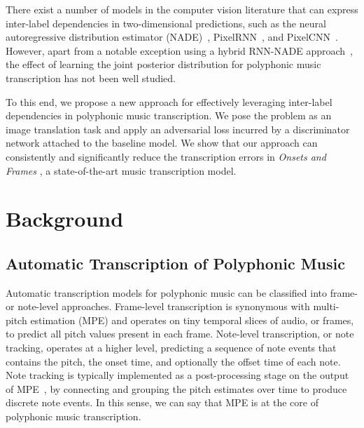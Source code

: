 There exist a number of models in the computer vision literature that can express inter-label dependencies in two-dimensional predictions, such as the neural autoregressive distribution estimator (NADE)~\cite{larochelle2011nade}, PixelRNN~\cite{oord2016pixelrnn}, and PixelCNN~\cite{oord2016pixelcnn}.
However, apart from a notable exception using a hybrid RNN-NADE approach~\cite{boulangerlewandowski2012temporal}, the effect of learning the joint posterior distribution for polyphonic music transcription has not been well studied.


To this end, we propose a new approach for effectively leveraging inter-label dependencies in polyphonic music transcription. We pose the problem as an image translation task and apply an adversarial loss incurred by a discriminator network attached to the baseline model.
We show that our approach can consistently and significantly reduce the transcription errors in \emph{Onsets and Frames} \cite{hawthorne2018onsetsframes}, a state-of-the-art music transcription model.


\section{Background}

\subsection{Automatic Transcription of Polyphonic Music}

Automatic transcription models for polyphonic music can be classified into frame- or note-level approaches.
Frame-level transcription is synonymous with multi-pitch estimation (MPE) and operates on tiny temporal slices of audio, or frames, to predict all pitch values present in each frame.
Note-level transcription, or note tracking, operates at a higher level, predicting a sequence of note events that contains the pitch, the onset time, and optionally the offset time of each note.
Note tracking is typically implemented as a post-processing stage on the output of MPE~\cite{benetos2019amt}, by connecting and grouping the pitch estimates over time to produce discrete note events.
In this sense, we can say that MPE is at the core of polyphonic music transcription.


